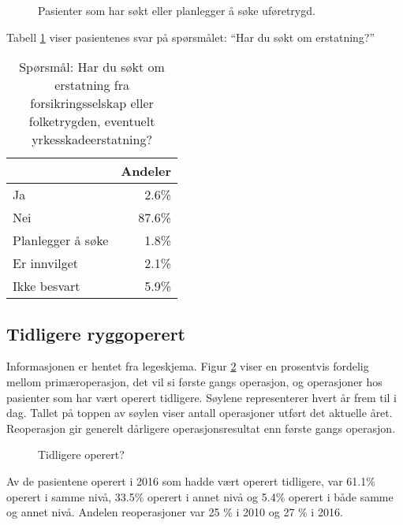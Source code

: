 \begin{figure}[ht]
\caption{\label{fig:Ufor} Pasienter som har søkt eller planlegger å søke uføretrygd.} 
\end{figure}

Tabell \ref{tab:Erst} viser pasientenes svar på spørsmålet: ``Har du søkt om erstatning?'' 

\begin{table}[ht]
\centering
\begin{tabular}{lr}
  \hline
 & Andeler \\ 
  \hline
Ja & 2.6\% \\ 
  Nei & 87.6\% \\ 
  Planlegger å søke & 1.8\% \\ 
  Er innvilget & 2.1\% \\ 
  Ikke besvart & 5.9\% \\ 
   \hline
\end{tabular}
\caption{Spørsmål: Har du søkt om erstatning fra forsikringsselskap eller folketrygden, 
		eventuelt yrkesskadeerstatning?} 
\label{tab:Erst}
\end{table}


\clearpage

\subsection{Tidligere ryggoperert}
Informasjonen er hentet fra legeskjema.
Figur \ref{fig:TidlOp} viser en prosentvis fordelig mellom primæroperasjon, det vil si første gangs 
operasjon, og operasjoner hos pasienter som har vært operert tidligere.  
Søylene representerer hvert år frem til i dag. Tallet på toppen av søylen viser antall operasjoner utført 
det aktuelle året. Reoperasjon gir generelt dårligere operasjonsresultat enn første gangs operasjon.



\begin{figure}[ht]
\caption{\label{fig:TidlOp} Tidligere operert? }
\end{figure}



Av de pasientene operert i 2016 som hadde vært operert tidligere, var 61.1\% 
operert i samme nivå, 33.5\% 
operert i annet nivå og 5.4\% 
operert i både samme og annet nivå.
Andelen reoperasjoner var 25 \% i 2010 og 27 \% i 2016.



